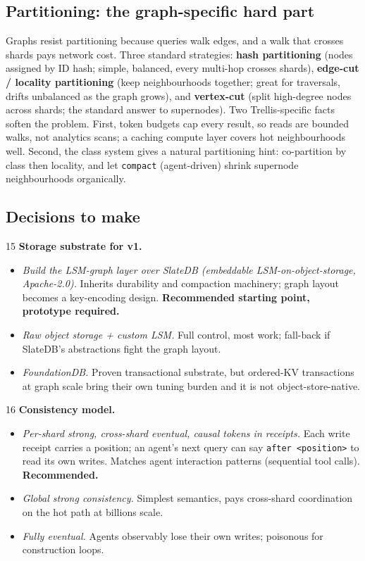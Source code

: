 \documentclass[11pt]{article}
\begin{document}
\subsection{Partitioning: the graph-specific hard part}

Graphs resist partitioning because queries walk edges, and a walk that crosses shards pays network cost. Three standard strategies: \textbf{hash partitioning} (nodes assigned by ID hash; simple, balanced, every multi-hop crosses shards), \textbf{edge-cut / locality partitioning} (keep neighbourhoods together; great for traversals, drifts unbalanced as the graph grows), and \textbf{vertex-cut} (split high-degree nodes across shards; the standard answer to supernodes). Two Trellis-specific facts soften the problem. First, token budgets cap every result, so reads are bounded walks, not analytics scans; a caching compute layer covers hot neighbourhoods well. Second, the class system gives a natural partitioning hint: co-partition by class then locality, and let \texttt{compact} (agent-driven) shrink supernode neighbourhoods organically.

\subsection{Decisions to make}

\begin{decisionbox}{15}
\textbf{Storage substrate for v1.}
\begin{itemize}[leftmargin=1.4em,itemsep=1pt]
  \item[A.] \emph{Build the LSM-graph layer over SlateDB (embeddable LSM-on-object-storage, Apache-2.0).} Inherits durability and compaction machinery; graph layout becomes a key-encoding design. \textbf{Recommended starting point, prototype required.}
  \item[B.] \emph{Raw object storage + custom LSM.} Full control, most work; fall-back if SlateDB's abstractions fight the graph layout.
  \item[C.] \emph{FoundationDB.} Proven transactional substrate, but ordered-KV transactions at graph scale bring their own tuning burden and it is not object-store-native.
\end{itemize}
\end{decisionbox}

\begin{decisionbox}{16}
\textbf{Consistency model.}
\begin{itemize}[leftmargin=1.4em,itemsep=1pt]
  \item[A.] \emph{Per-shard strong, cross-shard eventual, causal tokens in receipts.} Each write receipt carries a position; an agent's next query can say \texttt{after <position>} to read its own writes. Matches agent interaction patterns (sequential tool calls). \textbf{Recommended.}
  \item[B.] \emph{Global strong consistency.} Simplest semantics, pays cross-shard coordination on the hot path at billions scale.
  \item[C.] \emph{Fully eventual.} Agents observably lose their own writes; poisonous for construction loops.
\end{itemize}
\end{decisionbox}
\end{document}
